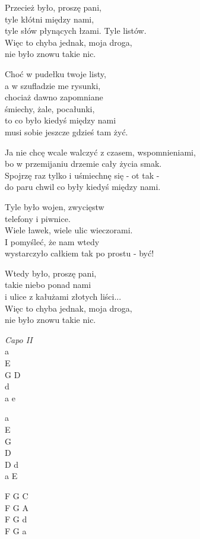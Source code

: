 \begin{text}
    \chordfill
    Przecież było, proszę pani,\\
    tyle kłótni między nami,\\
    tyle słów płynących łzami. Tyle listów.\\
    Więc to chyba jednak, moja droga,\\
    nie było znowu takie nic.

    Choć w pudełku twoje listy,\\
    a w szufladzie me rysunki,\\
    chociaż dawno zapomniane\\
    śmiechy, żale, pocałunki,\\
    to co było kiedyś między nami\\
    musi sobie jeszcze gdzieś tam żyć.

    Ja nie chcę wcale walczyć z czasem, wspomnieniami,\\
    bo w przemijaniu drzemie cały życia smak.\\
    Spojrzę raz tylko i uśmiechnę się - ot tak -\\
    do paru chwil co były kiedyś między nami.

    Tyle było wojen, zwycięstw\\
    telefony i piwnice.\\
    Wiele ławek, wiele ulic wieczorami.\\
    I pomyśleć, że nam wtedy\\
    wystarczyło całkiem tak po prostu - być!

    Wtedy było, proszę pani,\\
    takie niebo ponad nami\\
    i ulice z kałużami złotych liści...\\
    Więc to chyba jednak, moja droga,\\
    nie było znowu takie nic.
\end{text}
\begin{chord}
    \textit{Capo II}\\
    a\\
    E\\
    G D\\
    d\\
    a e

    a\\
    E\\
    G\\
    D\\
    D d\\
    a E

    F G C\\
    F G A\\
    F G d\\
    F G a
\end{chord}